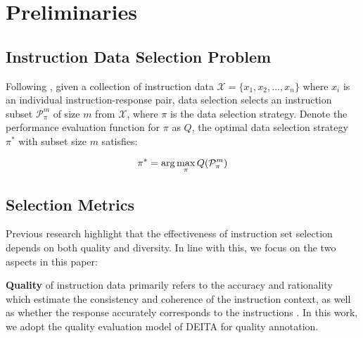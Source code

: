 \section{Preliminaries}
\label{appendix: preliminary}
\subsection{Instruction Data Selection Problem}
Following \citet{ds-deita}, given a collection of instruction data $\mathcal{X} = \{x_1, x_2, ..., x_n\}$ where $x_i$ is an individual instruction-response pair, data selection selects an instruction subset $\mathcal{P}_{\pi}^m$ of size $m$ from $\mathcal{X}$, where $\pi$ is the data selection strategy. Denote the performance evaluation function for $\pi$ as $Q$, the optimal data selection strategy $\pi ^*$ with subset size $m$ satisfies:


\begin{equation}
\small
    \pi^* = \arg \max_{\pi}Q(\mathcal{P}_\pi^m)
\end{equation}

\subsection{Selection Metrics}
Previous research \citep{ds-deita, ds-survey} highlight that the effectiveness of instruction set selection depends on both quality and diversity. In line with this, we focus on the two aspects in this paper:

\textbf{Quality} of instruction data primarily refers to the accuracy and rationality which estimate the consistency and coherence of the instruction context, as well as whether the response accurately corresponds to the instructions \citep{ds-survey}. In this work, we adopt the quality evaluation model of DEITA \citep{ds-deita} for quality annotation. 

